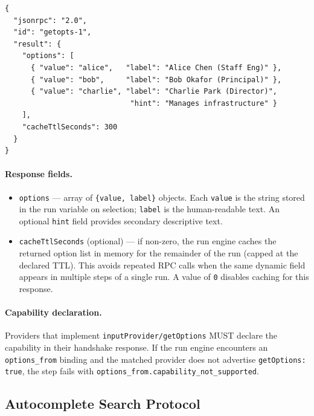 \begin{verbatim}
{
  "jsonrpc": "2.0",
  "id": "getopts-1",
  "result": {
    "options": [
      { "value": "alice",   "label": "Alice Chen (Staff Eng)" },
      { "value": "bob",     "label": "Bob Okafor (Principal)" },
      { "value": "charlie", "label": "Charlie Park (Director)",
                             "hint": "Manages infrastructure" }
    ],
    "cacheTtlSeconds": 300
  }
}
\end{verbatim}

\paragraph{Response fields.}
\begin{itemize}
  \item \texttt{options} — array of \texttt{\{value, label\}} objects.  Each
        \texttt{value} is the string stored in the run variable on selection;
        \texttt{label} is the human-readable text.  An optional \texttt{hint} field
        provides secondary descriptive text.
  \item \texttt{cacheTtlSeconds} (optional) — if non-zero, the run engine caches the
        returned option list in memory for the remainder of the run (capped at the
        declared TTL).  This avoids repeated RPC calls when the same dynamic field
        appears in multiple steps of a single run.  A value of \texttt{0} disables
        caching for this response.
\end{itemize}

\paragraph{Capability declaration.}
Providers that implement \texttt{inputProvider/getOptions} MUST declare the capability
in their handshake response.  If the run engine encounters an \texttt{options\_from}
binding and the matched provider does not advertise \texttt{getOptions: true}, the step
fails with \texttt{options\_from.capability\_not\_supported}.

\subsection{Autocomplete Search Protocol}
\label{sec:autocomplete-search-protocol}

